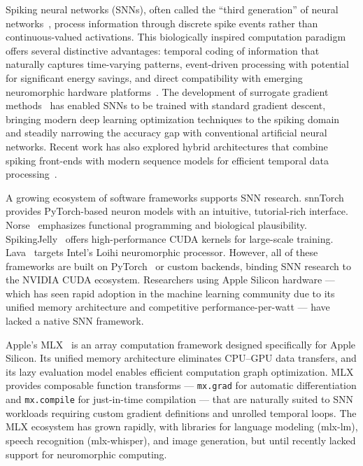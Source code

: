 \documentclass[11pt]{article}
\begin{document}
Spiking neural networks (SNNs), often called the ``third generation'' of neural networks~\citep{maass1997networks}, process information through discrete spike events rather than continuous-valued activations. This biologically inspired computation paradigm offers several distinctive advantages: temporal coding of information that naturally captures time-varying patterns, event-driven processing with potential for significant energy savings, and direct compatibility with emerging neuromorphic hardware platforms~\citep{davies2018loihi, roy2019towards}. The development of surrogate gradient methods~\citep{neftci2019surrogate, zenke2021remarkable} has enabled SNNs to be trained with standard gradient descent, bringing modern deep learning optimization techniques to the spiking domain and steadily narrowing the accuracy gap with conventional artificial neural networks. Recent work has also explored hybrid architectures that combine spiking front-ends with modern sequence models for efficient temporal data processing~\citep{qin2024mambaspike}.

A growing ecosystem of software frameworks supports SNN research. snnTorch~\citep{eshraghian2023training} provides PyTorch-based neuron models with an intuitive, tutorial-rich interface. Norse~\citep{pehle2021norse} emphasizes functional programming and biological plausibility. SpikingJelly~\citep{fang2023spikingjelly} offers high-performance CUDA kernels for large-scale training. Lava~\citep{lava2021} targets Intel's Loihi neuromorphic processor. However, all of these frameworks are built on PyTorch~\citep{paszke2019pytorch} or custom backends, binding SNN research to the NVIDIA CUDA ecosystem. Researchers using Apple Silicon hardware --- which has seen rapid adoption in the machine learning community due to its unified memory architecture and competitive performance-per-watt --- have lacked a native SNN framework.

Apple's MLX~\citep{mlx2023} is an array computation framework designed specifically for Apple Silicon. Its unified memory architecture eliminates CPU--GPU data transfers, and its lazy evaluation model enables efficient computation graph optimization. MLX provides composable function transforms --- \texttt{mx.grad} for automatic differentiation and \texttt{mx.compile} for just-in-time compilation --- that are naturally suited to SNN workloads requiring custom gradient definitions and unrolled temporal loops. The MLX ecosystem has grown rapidly, with libraries for language modeling (mlx-lm), speech recognition (mlx-whisper), and image generation, but until recently lacked support for neuromorphic computing.
\end{document}
